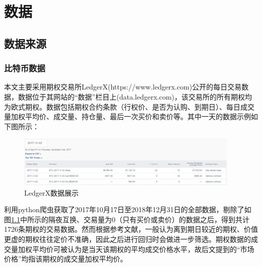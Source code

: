 \chapter{数据}
\section{数据来源}
\subsection{比特币数据}
\par{
    
    本文主要采用期权交易所LedgerX(https://www.ledgerx.com)公开的每日交易数据，数据位于其网站的“数据”栏目上(data.ledgerx.com)，该交易所的所有期权均为欧式期权。数据包括期权合约条款（行权价、是否为认购、到期日）、每日成交量加权平均价、成交量、持仓量、最后一次买价和卖价等。其中一天的数据示例如下图所示：
    \begin{figure}[H]
        \begin{small}
            \begin{center}
                \includegraphics[width=0.95\textwidth]{figures/data_example.png}
            \end{center}
            \caption{LedgerX数据展示}
            \label{data_example}
        \end{small}
    \end{figure}
    利用python爬虫获取了2017年10月17日至2018年12月31日的全部数据，剔除了如图\ref{data_example}中所示的隔夜互换、交易量为0（只有买价或卖价）的数据之后，得到共计1726条期权的交易数据。然而根据参考文献\cite{J-1972}\cite{Jame-1979}，一般认为离到期日较近的期权、价值更虚的期权往往定价不准确，因此之后进行回归时会做进一步筛选。期权数据的成交量加权平均价可被认为是当天该期权的平均成交价格水平，故后文提到的“市场价格”均指该期权的成交量加权平均价。
}

